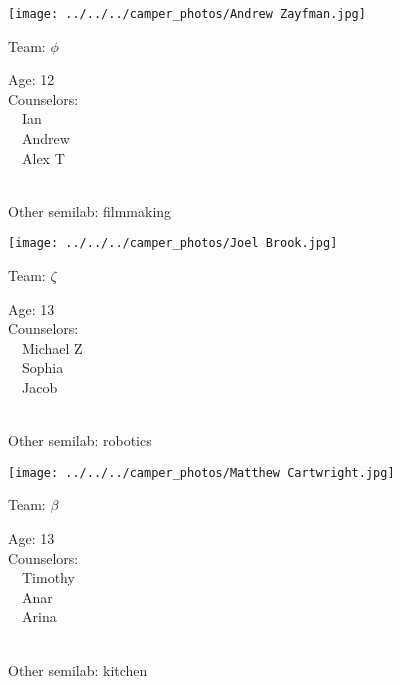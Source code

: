 \documentclass[10pt,letterpaper, landscape]{article}
\begin{document}
\horizontalshiftfornextsticker
\renewcommand{\baselinestretch}{1} \begin{sticker}
\noindent\begin{minipage}{0.5\textwidth}\texttt{[image: ../../../camper\_photos/Andrew Zayfman.jpg]}\end{minipage}\begin{minipage}{0.45\textwidth}
Team: {\Large $\phi$}

Age:        12\\
Counselors: \\\ \ Ian\\\ \ Andrew\\\ \ Alex T\\
\end{minipage} \\ \vspace{0.07in}
Other semilab: filmmaking
\end{sticker}
\horizontalshiftfornextsticker
\renewcommand{\baselinestretch}{1} \begin{sticker}
\noindent\begin{minipage}{0.5\textwidth}\texttt{[image: ../../../camper\_photos/Joel Brook.jpg]}\end{minipage}\begin{minipage}{0.45\textwidth}
Team: {\Large $\zeta$}

Age:        13\\
Counselors: \\\ \ Michael Z\\\ \ Sophia\\\ \ Jacob\\
\end{minipage} \\ \vspace{0.07in}
Other semilab: robotics
\end{sticker}
\verticalshiftfornextsticker
\renewcommand{\baselinestretch}{1} \begin{sticker}
\noindent\begin{minipage}{0.5\textwidth}\texttt{[image: ../../../camper\_photos/Matthew Cartwright.jpg]}\end{minipage}\begin{minipage}{0.45\textwidth}
Team: {\Large $\beta$}

Age:        13\\
Counselors: \\\ \ Timothy\\\ \ Anar\\\ \ Arina\\
\end{minipage} \\ \vspace{0.07in}
Other semilab: kitchen
\end{sticker}
\end{document}
